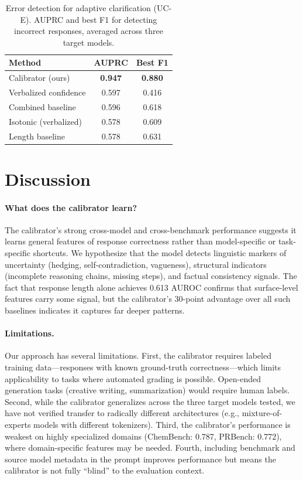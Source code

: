 \documentclass{colm2026}
\begin{document}
\begin{table}[t]
  \centering
  \small
  \caption{Error detection for adaptive clarification (UC-E). AUPRC and best F1 for detecting incorrect responses, averaged across three target models.}
  \label{tab:uc_e}
  \begin{tabular}{lcc}
    \toprule
    Method & AUPRC & Best F1 \\
    \midrule
    Calibrator (ours) & \textbf{0.947} & \textbf{0.880} \\
    Verbalized confidence & 0.597 & 0.416 \\
    Combined baseline & 0.596 & 0.618 \\
    Isotonic (verbalized) & 0.578 & 0.609 \\
    Length baseline & 0.578 & 0.631 \\
    \bottomrule
  \end{tabular}
\end{table}

\section{Discussion}
\label{sec:discussion}

\paragraph{What does the calibrator learn?}
The calibrator's strong cross-model and cross-benchmark performance suggests it learns general features of response correctness rather than model-specific or task-specific shortcuts. We hypothesize that the model detects linguistic markers of uncertainty (hedging, self-contradiction, vagueness), structural indicators (incomplete reasoning chains, missing steps), and factual consistency signals. The fact that response length alone achieves 0.613 AUROC confirms that surface-level features carry some signal, but the calibrator's 30-point advantage over all such baselines indicates it captures far deeper patterns.

\paragraph{Limitations.}
Our approach has several limitations. First, the calibrator requires labeled training data---responses with known ground-truth correctness---which limits applicability to tasks where automated grading is possible. Open-ended generation tasks (creative writing, summarization) would require human labels. Second, while the calibrator generalizes across the three target models tested, we have not verified transfer to radically different architectures (e.g., mixture-of-experts models with different tokenizers). Third, the calibrator's performance is weakest on highly specialized domains (ChemBench: 0.787, PRBench: 0.772), where domain-specific features may be needed. Fourth, including benchmark and source model metadata in the prompt improves performance but means the calibrator is not fully ``blind'' to the evaluation context.
\end{document}
